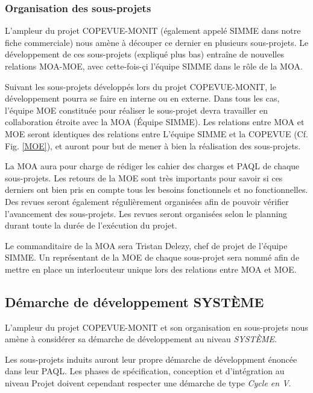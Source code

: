 \documentclass{mise_en_page}
\begin{document}
\subsubsection{Organisation des sous-projets}

L'ampleur du projet COPEVUE-MONIT (également appelé SIMME dans notre fiche commerciale) nous amène à découper ce dernier en plusieurs sous-projets. Le développement de ces sous-projets (expliqué plus bas) entraîne de nouvelles relations MOA-MOE, avec cette-fois-çi l'équipe SIMME dans le rôle de la MOA.

Suivant les sous-projets développés lors du projet COPEVUE-MONIT, le développement pourra se faire en interne ou en externe. Dans tous les cas, l'équipe MOE constituée pour réaliser le sous-projet devra travailler en collaboration étroite avec la MOA (Équipe SIMME). Les relations entre MOA et MOE seront identiques des relations entre L'équipe SIMME et la COPEVUE (Cf. Fig. \ref{MOE}), et auront pour but de mener à bien la réalisation des sous-projets.

La MOA aura pour charge de rédiger les cahier des charges et PAQL de chaque sous-projets. Les retours de la MOE sont très importants pour savoir si ces derniers ont bien pris en compte tous les besoins fonctionnels et no fonctionnelles. Des revues seront également régulièrement organisées afin de pouvoir vérifier l'avancement des sous-projets. Les revues seront organisées selon le planning durant toute la durée de l'exécution du projet.

Le commanditaire de la MOA sera Tristan Delezy, chef de projet de l'équipe SIMME. Un représentant de la MOE de chaque sous-projet sera nommé afin de mettre en place un interlocuteur unique lors des relations entre MOA et MOE.

\subsection{Démarche de développement SYSTÈME}

L'ampleur du projet COPEVUE-MONIT et son organisation en sous-projets nous amène à considérer sa démarche de développement au niveau \emph{SYSTÈME}.

Les sous-projets induits auront leur propre démarche de développment énoncée dans leur PAQL. Les phases de spécification, conception et d'intégration au niveau Projet doivent cependant respecter une démarche de type \emph{Cycle en V}.
\end{document}
